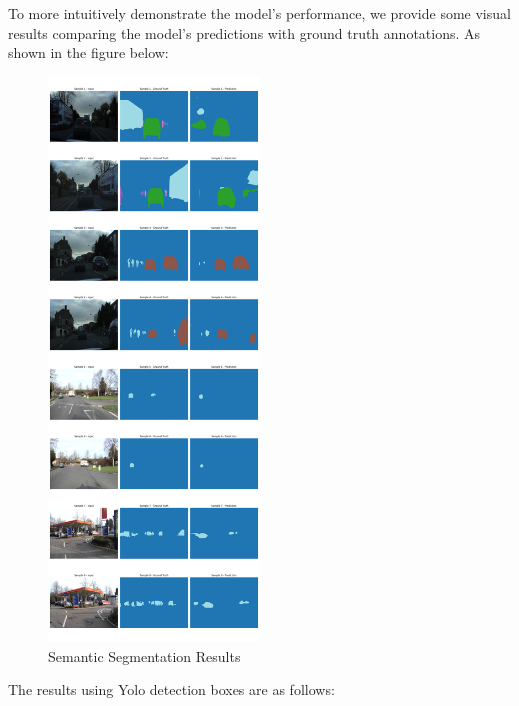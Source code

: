 \documentclass[conference]{IEEEtran}
\begin{document}

To more intuitively demonstrate the model's performance, we provide some visual results comparing the model's predictions with ground truth annotations. As shown in the figure below:

\begin{figure}[htbp]
    \centerline{\includegraphics[width=0.5\textwidth]{matrials/segmentation_results.png}}
    \caption{Semantic Segmentation Results}
    \label{fig:segmentation}
\end{figure}


The results using Yolo detection boxes are as follows:
\end{document}
